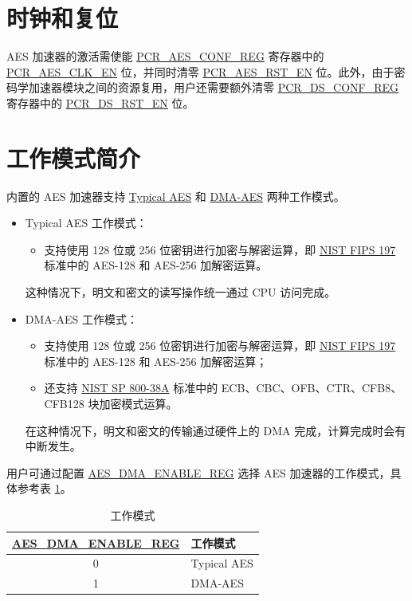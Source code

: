 \documentclass[main\_\_CN.tex]{subfiles}
\begin{document}
\section{时钟和复位}
AES 加速器的激活需使能 \hyperref[regdesc:PCRAESCONFREG]{PCR\_AES\_CONF\_REG} 寄存器中的 \hyperref[fielddesc:PCRAESCLKEN]{PCR\_AES\_CLK\_EN} 位，并同时清零 \hyperref[fielddesc:PCRAESRSTEN]{PCR\_AES\_RST\_EN} 位。此外，由于密码学加速器模块之间的资源复用，用户还需要额外清零 \hyperref[regdesc:PCRDSCONFREG]{PCR\_DS\_CONF\_REG} 寄存器中的 \hyperref[fielddesc:PCRDSRSTEN]{PCR\_DS\_RST\_EN} 位。



\section{工作模式简介}

\chipname{} 内置的 AES 加速器支持 \hyperref[sec:aes-typical-modes]{Typical AES} 和 \hyperref[sec:aes-dma-aes]{DMA-AES} 两种工作模式。

\begin{itemize}
    \item Typical AES 工作模式：
    \begin{itemize}
        \item 支持使用 128 位或 256 位密钥进行加密与解密运算，即 \href{https://nvlpubs.nist.gov/nistpubs/FIPS/NIST.FIPS.197.pdf}{NIST FIPS 197} 标准中的 AES-128 和 AES-256  加解密运算。
    \end{itemize}
    这种情况下，明文和密文的读写操作统一通过 CPU 访问完成。
    \item DMA-AES 工作模式：
    \begin{itemize}
        \item 支持使用 128 位或 256 位密钥进行加密与解密运算，即 \href{https://nvlpubs.nist.gov/nistpubs/FIPS/NIST.FIPS.197.pdf}{NIST FIPS 197} 标准中的 AES-128 和 AES-256 加解密运算；
        \item 还支持 \href{https://nvlpubs.nist.gov/nistpubs/Legacy/SP/nistspecialpublication800-38a.pdf}{NIST SP 800-38A} 标准中的 ECB、CBC、OFB、CTR、CFB8、CFB128 块加密模式运算。
    \end{itemize}
    在这种情况下，明文和密文的传输通过硬件上的 DMA 完成，计算完成时会有中断发生。
\end{itemize}

用户可通过配置 \hyperref[regdesc:AESDMAENABLEREG]{AES\_DMA\_ENABLE\_REG} 选择 AES 加速器的工作模式，具体参考表 \ref{tab:aes-dma-enable}。

\begin{longtable}[c]{ |c|l| }
\caption{工作模式}
\label{tab:aes-dma-enable}
\\\hline 
\rowcolor{lightgray}
\textbf{\hyperref[regdesc:AESDMAENABLEREG]{AES\_DMA\_ENABLE\_REG}}       & \textbf{工作模式}\\
    \hline
    0           & Typical AES    \\
    \hline
    1           & DMA-AES        \\
    \hline
\end{longtable}
\end{document}
